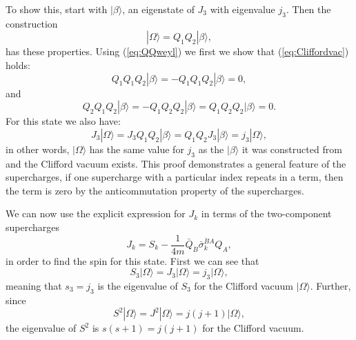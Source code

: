 \documentclass[notes.tex]{subfiles}
\begin{document}
To show this, start with $|\beta\rangle$, an eigenstate of $J_3$ with eigenvalue $j_3$. Then the construction
\[ |\Omega\rangle=Q_1Q_2|\beta\rangle,\]
has these properties. Using (\ref{eq:QQweyl}) we first we show that (\ref{eq:Cliffordvac}) holds:
\[Q_1Q_1Q_2|\beta\rangle = -Q_1Q_1Q_2|\beta \rangle = 0,\]
and
\[Q_2Q_1Q_2|\beta\rangle = -Q_1Q_2Q_2|\beta\rangle = Q_1Q_2Q_2|\beta\rangle= 0.\]
For this state we also  have:
\begin{equation*}
J_3 |\Omega\rangle = J_3Q_1Q_2|\beta\rangle =Q_1Q_2J_3|\beta\rangle = j_3|\Omega\rangle,
\end{equation*}
in other words, $|\Omega\rangle$ has the same value for $j_3$ as the $|\beta\rangle$ it was constructed from and  the Clifford vacuum exists. This proof demonstrates a general feature of the supercharges, if one supercharge with a particular index repeats in a term, then the term is zero by the anticommutation property of the supercharges.

We can now use the explicit expression  for $J_k$ in terms of the two-component supercharges
\begin{equation}
J_k = S_k - \frac{1}{4m}\bar{Q}_{\dot{B}}\bar{\sigma}_k^{\dot{B}A}Q_A,
\label{eq:Jk_twocomp}
\end{equation}
in order to find the spin for this state. First we can see that
\[S_3|\Omega\rangle = J_3|\Omega\rangle =j_3|\Omega\rangle,\]
meaning that $s_3 = j_3$ is the eigenvalue of $S_3$ for the Clifford vacuum $|\Omega\rangle$. Further, since 
\[S^2|\Omega\rangle = J^2|\Omega\rangle =j(j+1)|\Omega\rangle,\]
the eigenvalue of $S^2$ is $s(s+1)=j(j+1)$ for the Clifford vacuum.
\end{document}
